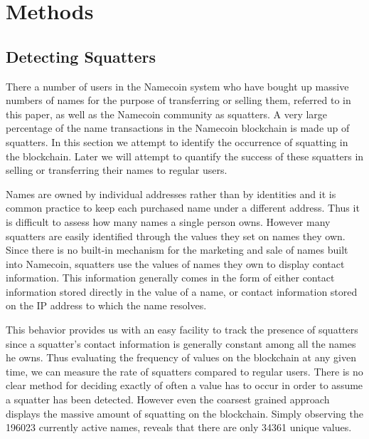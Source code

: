 \section{Methods}

\label{sec:methods}

\subsection{Detecting Squatters}
There a number of users in the Namecoin system who have bought up massive numbers of names for the purpose of transferring or selling them, referred to in this paper, as well as the Namecoin community as squatters. A very large percentage of the name transactions in the Namecoin blockchain is made up of squatters. In this section we attempt to identify the occurrence of squatting in the blockchain. Later we will attempt to quantify the success of these squatters in selling or transferring their names to regular users.

Names are owned by individual addresses rather than by identities and it is common practice to keep each purchased name under a different address. Thus it is difficult to assess how many names a single person owns. However many squatters are easily identified through the values they set on names they own. Since there is no built-in mechanism for the marketing and sale of names built into Namecoin, squatters use the values of names they own to display contact information. This information generally comes in the form of either contact information stored directly in the value of a name, or contact information stored on the IP address to which the name resolves.

This behavior provides us with an easy facility to track the presence of squatters since a squatter's contact information is generally constant among all the names he owns. Thus evaluating the frequency of values on the blockchain at any given time, we can measure the rate of squatters compared to regular users.
There is no clear method for deciding exactly of often a value has to occur in order to assume a squatter has been detected. However even the coarsest grained approach displays the massive amount of squatting on the blockchain. Simply observing the 196023 currently active names, reveals that there are only 34361 unique values.


